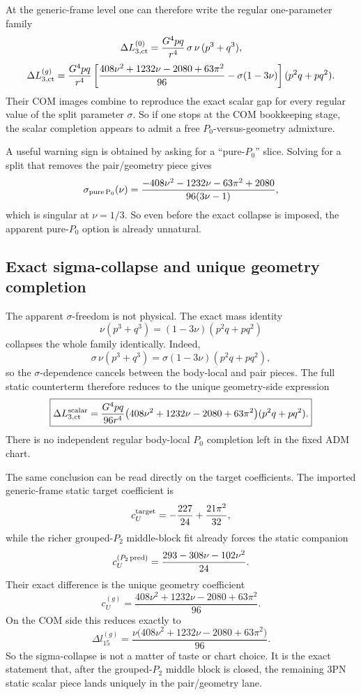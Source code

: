 \documentclass[11pt]{article}
\begin{document}
At the generic-frame level one can therefore write the regular one-parameter family
\[
\Delta L_{3,\rm ct}^{(0)}
=
\frac{G^4pq}{r^4}\,\sigma\,\nu\,(p^3+q^3),
\]
\[
\Delta L_{3,\rm ct}^{(g)}
=
\frac{G^4pq}{r^4}
\left[
\frac{408\nu^2+1232\nu-2080+63\pi^2}{96}
-\sigma(1-3\nu)
\right](p^2q+pq^2).
\]
Their COM images combine to reproduce the exact scalar gap for every regular value of the split parameter $\sigma$. So if one stops at the COM bookkeeping stage, the scalar completion appears to admit a free $P_0$-versus-geometry admixture.

A useful warning sign is obtained by asking for a ``pure-$P_0$'' slice. Solving for a split that removes the pair/geometry piece gives
\[
\sigma_{\rm pure\,P_0}(\nu)
=
\frac{-408\nu^2-1232\nu-63\pi^2+2080}{96(3\nu-1)},
\]
which is singular at $\nu=1/3$. So even before the exact collapse is imposed, the apparent pure-$P_0$ option is already unnatural.

\subsection{Exact sigma-collapse and unique geometry completion}
\label{app:static_p0_geometry_counterterm_sigma_collapse:sigma_collapse}

The apparent $\sigma$-freedom is not physical. The exact mass identity
\[
\boxed{
\nu(p^3+q^3)=(1-3\nu)(p^2q+pq^2)
}
\]
collapses the whole family identically. Indeed,
\[
\sigma\,\nu(p^3+q^3)=\sigma(1-3\nu)(p^2q+pq^2),
\]
so the $\sigma$-dependence cancels between the body-local and pair pieces. The full static counterterm therefore reduces to the unique geometry-side expression
\[
\boxed{
\Delta L_{3,\rm ct}^{\rm scalar}
=
\frac{G^4pq}{96r^4}
\bigl(408\nu^2+1232\nu-2080+63\pi^2\bigr)
(p^2q+pq^2).
}
\]
There is no independent regular body-local $P_0$ completion left in the fixed ADM chart.

The same conclusion can be read directly on the target coefficients. The imported generic-frame static target coefficient is
\[
c_U^{\rm target}=-\frac{227}{24}+\frac{21\pi^2}{32},
\]
while the richer grouped-$P_2$ middle-block fit already forces the static companion
\[
c_U^{(P_2\,\rm pred)}=\frac{293-308\nu-102\nu^2}{24}.
\]
Their exact difference is the unique geometry coefficient
\[
\boxed{
c_U^{(g)}=
\frac{408\nu^2+1232\nu-2080+63\pi^2}{96}.
}
\]
On the COM side this reduces exactly to
\[
\boxed{
\Delta l_{15}^{(g)}=
\frac{\nu\bigl(408\nu^2+1232\nu-2080+63\pi^2\bigr)}{96}.
}
\]
So the sigma-collapse is not a matter of taste or chart choice. It is the exact statement that, after the grouped-$P_2$ middle block is closed, the remaining $3$PN static scalar piece lands uniquely in the pair/geometry lane.
\end{document}
